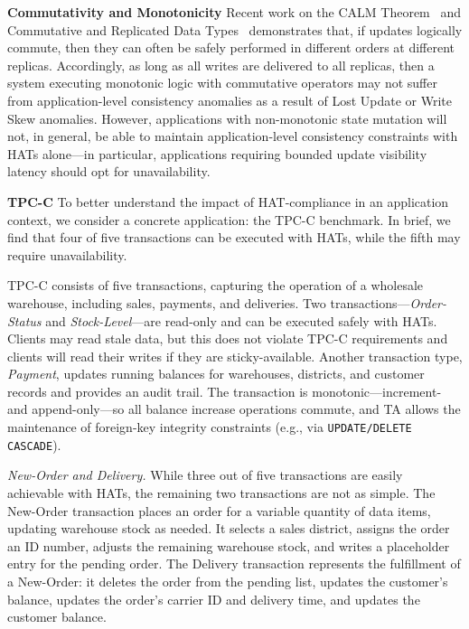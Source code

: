 \vspace{.5em}\noindent\textbf{Commutativity and Monotonicity} Recent
work on the CALM Theorem~\cite{calm} and Commutative and Replicated
Data Types~\cite{crdt} demonstrates that, if updates logically
commute, then they can often be safely performed in different orders
at different replicas. Accordingly, as long as all writes are
delivered to all replicas, then a system executing monotonic logic
with commutative operators may not suffer from application-level
consistency anomalies as a result of Lost Update or Write Skew
anomalies. However, applications with non-monotonic state mutation
will not, in general, be able to maintain application-level
consistency constraints with HATs alone---in particular, applications
requiring bounded update visibility latency should opt for
unavailability.

\vspace{.5em}\noindent\textbf{TPC-C} To better understand the impact
of HAT-compliance in an application context, we consider a concrete
application: the TPC-C benchmark. In brief, we find that four of five
transactions can be executed with HATs, while the fifth may require
unavailability.

TPC-C consists of five transactions, capturing the operation of a
wholesale warehouse, including sales, payments, and deliveries. Two
transactions---\textit{Order-Status} and \textit{Stock-Level}---are
read-only and can be executed safely with HATs. Clients may read stale
data, but this does not violate TPC-C requirements and clients will
read their writes if they are sticky-available. Another transaction
type, \textit{Payment}, updates running balances for warehouses,
districts, and customer records and provides an audit trail. The
transaction is monotonic---increment- and append-only---so all balance
increase operations commute, and TA allows the maintenance of
foreign-key integrity constraints (e.g., via \texttt{UPDATE/DELETE
  CASCADE}).

\vspace{.5em}\noindent\textit{New-Order and Delivery.} While three out of
five transactions are easily achievable with HATs, the remaining two
transactions are not as simple. The New-Order transaction places an
order for a variable quantity of data items, updating warehouse stock
as needed. It selects a sales district, assigns the order an ID
number, adjusts the remaining warehouse stock, and writes a
placeholder entry for the pending order. The Delivery transaction
represents the fulfillment of a New-Order: it deletes the order from
the pending list, updates the customer's balance, updates the order's
carrier ID and delivery time, and updates the customer balance.

